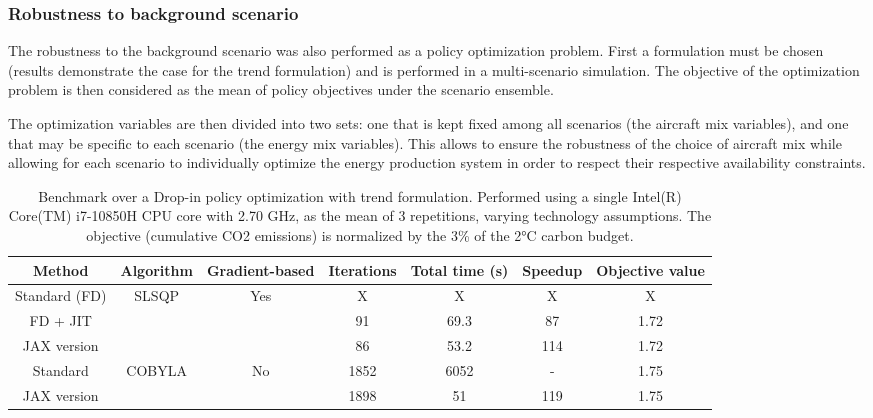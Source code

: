 \documentclass[a4paper,fleqn]{cas-dc}
\begin{document}
\subsubsection{Robustness to background scenario}

The robustness to the background scenario was also performed as a policy optimization problem. First a formulation must be chosen (results demonstrate the case for the trend formulation) and is performed in a multi-scenario simulation. The objective of the optimization problem is then considered as the mean of policy objectives under the scenario ensemble.

The optimization variables are then divided into two sets: one that is kept fixed among all scenarios (the aircraft mix variables), and one that may be specific to each scenario (the energy mix variables). This allows to ensure the robustness of the choice of aircraft mix while allowing for each scenario to individually optimize the energy production system in order to respect their respective availability constraints.

\begin{table}[width=\linewidth,cols=7,pos=h]
    \caption{Benchmark over a Drop-in policy optimization with trend formulation. Performed using a single Intel(R) Core(TM) i7-10850H CPU core with 2.70 GHz, as the mean of 3 repetitions, varying technology assumptions. The objective (cumulative CO2 emissions) is normalized by the 3\% of the 2°C carbon budget.}
    \centering
    \begin{tabular}{c|c|c|c c c|c}
    \toprule
     Method & Algorithm & Gradient-based & Iterations & Total time (s) & Speedup & Objective value \\
    \midrule

    Standard (FD) & \multirow{3}{*}{SLSQP} & \multirow{3}{*}{Yes} & X & X & X & X \\
    FD + JIT & &  & 91 & 69.3 & 87 & 1.72 \\
    JAX version &  &  & 86 & 53.2 & 114 & 1.72 \\
    \midrule
    Standard & \multirow{2}{*}{COBYLA} & \multirow{2}{*}{No} & 1852 & 6052 & - & 1.75 \\
    JAX version &  &  & 1898 & 51 & 119 & 1.75 \\
    \bottomrule
    \end{tabular}
    \label{tab:optimization}
\end{table}
\end{document}
